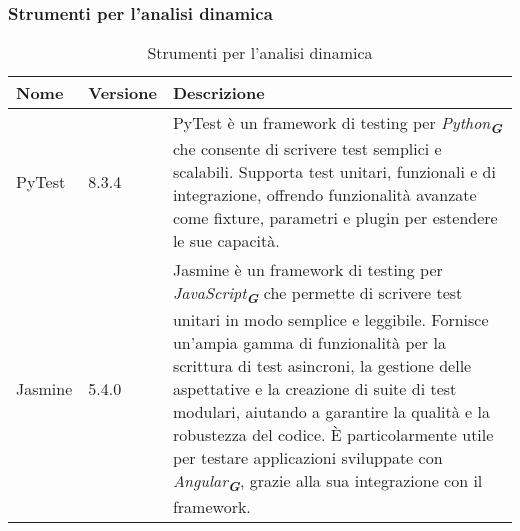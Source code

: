 \subsubsection{Strumenti per l’analisi dinamica}
\label{subsec:strumenti_analisi_dinamica}

\newpage

\begin{table}[h!]
    \centering
    \renewcommand{\arraystretch}{1.6} %
    \begin{tabularx}{\textwidth}{|p{2cm}|p{2cm}|X|} \hline
    \rowcolor[HTML]{FFD700} 
    \textbf{Nome} & \textbf{Versione} & \textbf{Descrizione} \\ \hline
    PyTest & 8.3.4 & PyTest è un framework di testing per \emph{Python}\textsubscript{\textbf{\textit{G}}} che consente di scrivere
                    test semplici e scalabili. 
                    Supporta test unitari, funzionali e di integrazione, offrendo funzionalità avanzate come fixture, parametri e
                    plugin per estendere le sue capacità. \\ \hline
    Jasmine & 5.4.0 & Jasmine è un framework di testing per \emph{JavaScript}\textsubscript{\textbf{\textit{G}}} che permette di
                      scrivere test unitari in modo semplice e leggibile. 
                      Fornisce un'ampia gamma di funzionalità per la scrittura di test asincroni, la gestione delle aspettative e
                      la creazione di suite di test modulari, aiutando a garantire la qualità e la robustezza del codice. 
                      È particolarmente utile per testare applicazioni sviluppate con \emph{Angular}\textsubscript{\textbf{\textit{G}}}, 
                      grazie alla sua integrazione con il framework. \\ \hline
    \end{tabularx}
    \caption{Strumenti per l’analisi dinamica}
\end{table}
